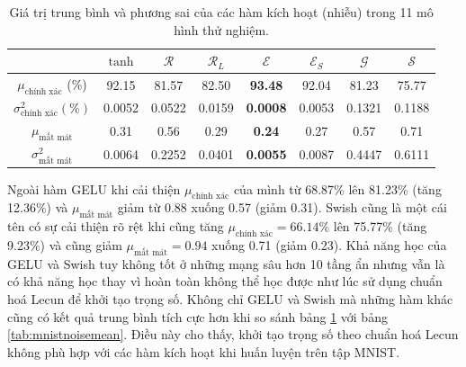 \begin{table}[ht!]
\centering
\def\arraystretch{1.5}
\begin{tabular}{c|c|c|c|c|c|c|c|}
\cline{2-8}
                        & $\tanh$      & $\mathcal{R}$      & $\mathcal{R}_L$      & $\mathcal{E}$      & $\mathcal{E}_S$      & $\mathcal{G}$      & $\mathcal{S}$      \\ \hline
\multicolumn{1}{|c|}{$\mu_{\text{chính xác}}$ (\%)} & 92.15  & 81.57  & 82.50  & \textbf{93.48}  & 92.04  & 81.23  & 75.77  \\ \hline
\multicolumn{1}{|c|}{$\sigma^2_{\text{chính xác}} (\%)$} & 0.0052 & 0.0522 & 0.0159 & \textbf{0.0008} & 0.0053 & 0.1321 & 0.1188 \\ \hline
\multicolumn{1}{|c|}{$\mu_{\text{mất mát}}$} & 0.31   & 0.56   & 0.29   & \textbf{0.24}   & 0.27   & 0.57   & 0.71   \\ \hline
\multicolumn{1}{|c|}{$\sigma^2_{\text{mất mát}}$} & 0.0064 & 0.2252 & 0.0401 & \textbf{0.0055} & 0.0087 & 0.4447 & 0.6111 \\ \hline
\end{tabular}
\caption{Giá trị trung bình và phương sai của các hàm kích hoạt (nhiễu) trong 11 mô hình thử nghiệm.}
\label{tab:wowinoisemean}
\end{table}

Ngoài hàm GELU khi cải thiện $\mu_{\text{chính xác}}$ của mình từ 68.87\% lên 81.23\% (tăng 12.36\%) và $\mu_{\text{mất mát}}$ giảm từ 0.88 xuống 0.57 (giảm 0.31).
Swish cũng là một cái tên có sự cải thiện rõ rệt khi cũng tăng $\mu_{\text{chính xác}} = 66.14\%$ lên 75.77\% (tăng 9.23\%) và cũng giảm $\mu_{\text{mất mát}} = 0.94$ xuống 0.71 (giảm 0.23).
Khả năng học của GELU và Swish tuy không tốt ở những mạng sâu hơn 10 tầng ẩn nhưng vẫn là có khả năng học thay vì hoàn toàn không thể học được như lúc sử dụng chuẩn hoá Lecun để khởi tạo trọng số.
Không chỉ GELU và Swish mà những hàm khác cũng có kết quả trung bình tích cực hơn khi so sánh bảng \ref{tab:wowinoisemean} với bảng \ref{tab:mnistnoisemean}.
Điều này cho thấy, khởi tạo trọng số theo chuẩn hoá Lecun không phù hợp với các hàm kích hoạt khi huấn luyện trên tập MNIST.

